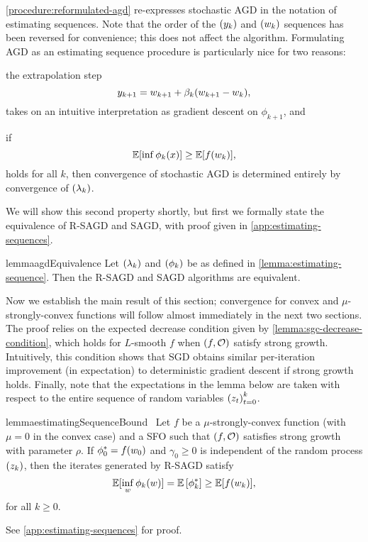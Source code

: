 \autoref{procedure:reformulated-agd} re-expresses stochastic AGD in the notation of estimating sequences. 
Note that the order of the \( \seq{\yk} \) and \( \seq{\wk} \) sequences has been reversed for convenience; this does not affect the algorithm.
Formulating AGD as an estimating sequence procedure is particularly nice for two reasons:
\begin{inparaenum}[(1)]
\item the extrapolation step \[ \ykk = \wkk + \beta_k (\wkk - \wk), \] takes on an intuitive interpretation as gradient descent on \( \phi_{k+1} \), and 
\item if \[  \E [\inf \phi_k(x)] \geq \E [f(\wk)], \] holds for all \( k \), then convergence of stochastic AGD is determined entirely by convergence of \( \seq{\lambda_k} \).
\end{inparaenum}
We will show this second property shortly, but first we formally state the equivalence of R-SAGD and SAGD, with proof given in \autoref{app:estimating-sequences}.

\begin{restatable}{lemma}{agdEquivalence}\label{lemma:agdEquivalence}
    Let \( \seq{\lambda_k} \) and \( \seq{\phi_k} \) be as defined in \autoref{lemma:estimating-sequence}.
    Then the R-SAGD and SAGD algorithms are equivalent.
\end{restatable}

Now we establish the main result of this section; convergence for convex and \( \mu \)-strongly-convex functions will follow almost immediately in the next two sections.
The proof relies on the expected decrease condition given by \autoref{lemma:sgc-decrease-condition}, which holds for \( L \)-smooth \( f \) when \( \rbr{f, \oracle{}} \) satisfy strong growth.
Intuitively, this condition shows that SGD obtains similar per-iteration improvement (in expectation) to deterministic gradient descent if strong growth holds. 
Finally, note that the expectations in the lemma below are taken with respect to the entire sequence of random variables \( \seq{\z_t}_{t=0}^k \).

\begin{restatable}{lemma}{estimatingSequenceBound}~\label{lemma:estimating-sequence-bound}
    Let \( f \) be a \( \mu \)-strongly-convex function (with \( \mu = 0 \) in the convex case) and \oracle{} a SFO such that \( \rbr{f, \oracle{}} \) satisfies strong growth with parameter \( \rho \).
    If \( \phi_0^* = f(\w_0) \) and \( \gamma_0 \geq 0 \) is independent of the random process \( \seq{\zk} \), then the iterates generated by R-SAGD satisfy 
    \[ \E [\inf_{w} \phi_k(\w)] = \E \sbr{\phi_k^*} \geq \E [f(\wk)], \]
    for all \( k \geq 0 \).
\end{restatable}
\noindent See \autoref{app:estimating-sequences} for proof.

